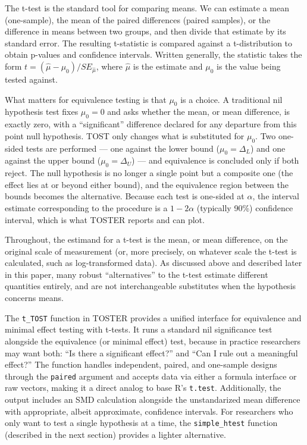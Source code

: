 \documentclass[]{interact}
\theoremstyle{plain}%
\theoremstyle{definition}
\theoremstyle{remark}
\begin{document}
The t-test is the standard tool for comparing means. We can estimate a
mean (one-sample), the mean of the paired differences (paired samples),
or the difference in means between two groups, and then divide that
estimate by its standard error. The resulting t-statistic is compared
against a t-distribution to obtain p-values and confidence intervals.
Written generally, the statistic takes the form
\(t = (\hat{\mu} - \mu_0)/SE_{\hat{\mu}}\), where \(\hat{\mu}\) is the
estimate and \(\mu_0\) is the value being tested against.

What matters for equivalence testing is that \(\mu_0\) is a choice. A
traditional nil hypothesis test fixes \(\mu_0 = 0\) and asks whether the
mean, or mean difference, is exactly zero, with a ``significant''
difference declared for any departure from this point null hypothesis.
TOST only changes what is substituted for \(\mu_0\). Two one-sided tests
are performed --- one against the lower bound (\(\mu_0 = \Delta_L\)) and
one against the upper bound (\(\mu_0 = \Delta_U\)) --- and equivalence
is concluded only if both reject. The null hypothesis is no longer a
single point but a composite one (the effect lies at or beyond either
bound), and the equivalence region between the bounds becomes the
alternative. Because each test is one-sided at \(\alpha\), the interval
estimate corresponding to the procedure is a \(1-2\alpha\) (typically
90\%) confidence interval, which is what TOSTER reports and can plot.

Throughout, the estimand for a t-test is the mean, or mean difference,
on the original scale of measurement (or, more precisely, on whatever
scale the t-test is calculated, such as log-transformed data). As
discussed above and described later in this paper, many robust
``alternatives'' to the t-test estimate different quantities entirely,
and are not interchangeable substitutes when the hypothesis concerns
means.

The \texttt{t\_TOST} function in TOSTER provides a unified interface for
equivalence and minimal effect testing with t-tests. It runs a standard
nil significance test alongside the equivalence (or minimal effect)
test, because in practice researchers may want both: ``Is there a
significant effect?'' and ``Can I rule out a meaningful effect?'' The
function handles independent, paired, and one-sample designs through the
\texttt{paired} argument and accepts data via either a formula interface
or raw vectors, making it a direct analog to base R's \texttt{t.test}.
Additionally, the output includes an SMD calculation alongside the
unstandarized mean difference with appropriate, albeit approximate,
confidence intervals. For researchers who only want to test a single
hypothesis at a time, the \texttt{simple\_htest} function (described in
the next section) provides a lighter alternative.
\end{document}
